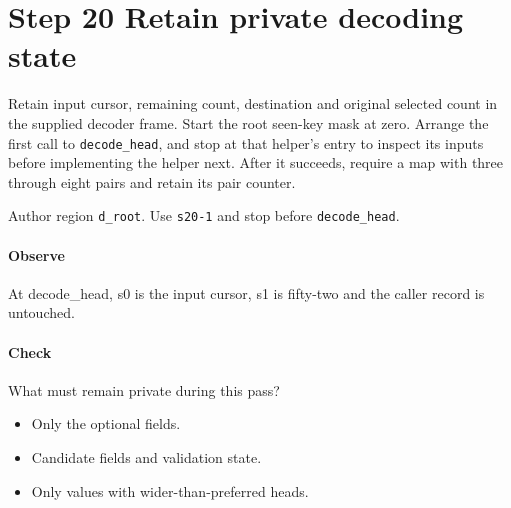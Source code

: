 \section{Step 20 Retain private decoding state}\label{cbor-s20}
Retain input cursor, remaining count, destination and original selected count in the supplied decoder frame. Start the root seen-key mask at zero. Arrange the first call to \texttt{decode\_head}, and stop at that helper's entry to inspect its inputs before implementing the helper next. After it succeeds, require a map with three through eight pairs and retain its pair counter.

Author region \texttt{d\_root}. Use \texttt{s20-1} and stop before \texttt{decode\_head}. 

\paragraph{Observe} At decode\_head, s0 is the input cursor, s1 is fifty-two and the caller record is untouched.

\paragraph{Check} What must remain private during this pass?
\begin{itemize}
\item[A.] Only the optional fields.
\item[B.] Candidate fields and validation state.
\item[C.] Only values with wider-than-preferred heads.
\end{itemize}
